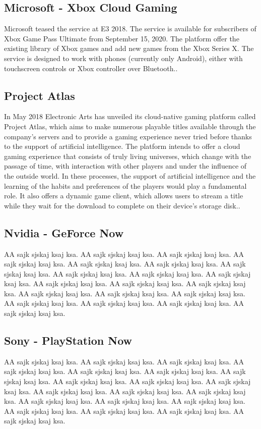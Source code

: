 \subsection{Microsoft - Xbox Cloud Gaming}
Microsoft teased the service at E3 2018. The service is available for subscribers of Xbox Game Pass Ultimate from September 15, 2020. The platform offer the existing library of Xbox games and add new games from the Xbox Series X. The service is designed to work with phones (currently only Android), either with touchscreen controls or Xbox controller over Bluetooth.\cite{Xbox_Game_Pass_cloud_gaming}.
\subsection{Project Atlas}
In May 2018 Electronic Arts has unveiled its cloud-native gaming platform called Project Atlas, which aims to make numerous playable titles available through the company's servers and to provide a gaming experience never tried before thanks to the support of artificial intelligence. The platform intends to offer a cloud gaming experience that consists of truly living universes, which change with the passage of time, with interaction with other players and under the influence of the outside world. In these processes, the support of artificial intelligence and the learning of the habits and preferences of the players would play a fundamental role. It also offers a dynamic game client, which allows users to stream a title while they wait for the download to complete on their device's storage disk.\cite{Project_Atlas}.
\subsection{Nvidia - GeForce Now}
AA sajk sjskaj ksaj ksa. AA sajk sjskaj ksaj ksa. AA sajk sjskaj ksaj ksa. AA sajk sjskaj ksaj ksa. AA sajk sjskaj ksaj ksa. AA sajk sjskaj ksaj ksa. AA sajk sjskaj ksaj ksa. AA sajk sjskaj ksaj ksa. AA sajk sjskaj ksaj ksa. AA sajk sjskaj ksaj ksa. AA sajk sjskaj ksaj ksa. AA sajk sjskaj ksaj ksa. AA sajk sjskaj ksaj ksa. AA sajk sjskaj ksaj ksa. AA sajk sjskaj ksaj ksa. AA sajk sjskaj ksaj ksa. AA sajk sjskaj ksaj ksa. AA sajk sjskaj ksaj ksa. AA sajk sjskaj ksaj ksa. AA sajk sjskaj ksaj ksa\cite{GeForce_Now}.
\subsection{Sony - PlayStation Now}
AA sajk sjskaj ksaj ksa. AA sajk sjskaj ksaj ksa. AA sajk sjskaj ksaj ksa. AA sajk sjskaj ksaj ksa. AA sajk sjskaj ksaj ksa. AA sajk sjskaj ksaj ksa. AA sajk sjskaj ksaj ksa. AA sajk sjskaj ksaj ksa. AA sajk sjskaj ksaj ksa. AA sajk sjskaj ksaj ksa. AA sajk sjskaj ksaj ksa. AA sajk sjskaj ksaj ksa. AA sajk sjskaj ksaj ksa. AA sajk sjskaj ksaj ksa. AA sajk sjskaj ksaj ksa. AA sajk sjskaj ksaj ksa. AA sajk sjskaj ksaj ksa. AA sajk sjskaj ksaj ksa. AA sajk sjskaj ksaj ksa. AA sajk sjskaj ksaj ksa\cite{PlayStation_Now}.
